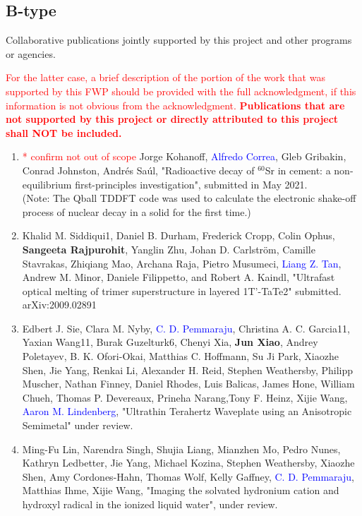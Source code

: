 \subsection{B-type}

Collaborative publications jointly supported by this project and other programs or agencies.

\textcolor{red}{For the latter case, a brief description of the portion of the work that was supported by this FWP should be provided with the full acknowledgment, if this information is not obvious from the acknowledgment. {\bf Publications that are not supported by this project or directly attributed to this project shall NOT be included.}}

\begin{enumerate}
    \item \textcolor{red}{* confirm not out of scope} Jorge Kohanoff, \textcolor{blue}{Alfredo Correa}, Gleb Gribakin, Conrad Johnston, Andr\'{e}s Sa\'{u}l, "Radioactive decay of $^{60}$Sr in cement: a non-equilibrium first-principles investigation", submitted in May 2021.\\
    (Note: The Qball TDDFT code was used to calculate the electronic shake-off process of nuclear decay in a solid for the first time.)
    \item Khalid M. Siddiqui1, Daniel B. Durham, Frederick Cropp, Colin Ophus, {\bf Sangeeta Rajpurohit}, Yanglin Zhu, Johan D. Carlstr\"{o}m, Camille Stavrakas, Zhiqiang Mao, Archana Raja, Pietro Musumeci, \textcolor{blue}{Liang Z. Tan}, Andrew M. Minor, Daniele Filippetto, and Robert A. Kaindl, "Ultrafast optical melting of trimer superstructure in layered 1T’-TaTe2" submitted.  arXiv:2009.02891
    \item Edbert J. Sie, Clara M. Nyby, \textcolor{blue}{C. D. Pemmaraju}, Christina A. C. Garcia11, Yaxian Wang11, Burak Guzelturk6, Chenyi Xia, {\bf Jun Xiao}, Andrey Poletayev, B. K. Ofori-Okai, Matthias C. Hoffmann, Su Ji Park, Xiaozhe Shen, Jie Yang, Renkai Li, Alexander H. Reid, Stephen Weathersby, Philipp Muscher, Nathan Finney, Daniel Rhodes, Luis Balicas, James Hone, William Chueh, Thomas P. Devereaux, Prineha Narang,Tony F. Heinz, Xijie Wang, \textcolor{blue}{Aaron M. Lindenberg}, "Ultrathin Terahertz Waveplate using an Anisotropic Semimetal" under review.
    
    \item Ming-Fu Lin, Narendra Singh, Shujia Liang, Mianzhen Mo, Pedro Nunes, Kathryn Ledbetter, Jie Yang, Michael Kozina, Stephen Weathersby, Xiaozhe Shen, Amy Cordones-Hahn, Thomas Wolf, Kelly Gaffney, \textcolor{blue}{C. D. Pemmaraju}, Matthias Ihme, Xijie Wang, "Imaging the solvated hydronium cation and hydroxyl radical in the ionized liquid water", under review.


\end{enumerate}
